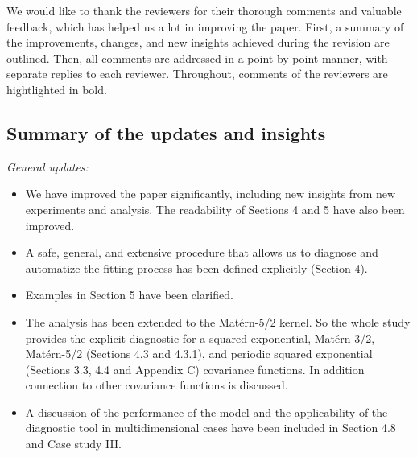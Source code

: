 \documentclass[11pt]{report}
\begin{document}
We would like to thank the reviewers for their thorough comments and valuable feedback, which has helped us a lot in improving the paper. First, a summary of the improvements, changes, and new insights achieved during the revision are outlined. Then, all comments are addressed in a point-by-point manner, with separate replies to each reviewer. 
Throughout, comments of the reviewers are hightlighted in bold.

\noindent \hdashrule{12.5cm}{0.2pt}{2mm 1pt}

\subsection*{Summary of the updates and insights}

\textit{General updates:}

\begin{itemize}

\item We have improved the paper significantly, including new insights from new experiments and analysis. The readability of Sections 4 and 5 have also been improved. 

\item A safe, general, and extensive procedure that allows us to diagnose and automatize the fitting process has been defined explicitly (Section 4). 

\item Examples in Section 5 have been clarified.

\item The analysis has been extended to the Mat\'ern-5/2 kernel. So the whole study provides the explicit diagnostic for a squared exponential, Mat\'ern-3/2, Mat\'ern-5/2 (Sections 4.3 and 4.3.1), and periodic squared exponential (Sections 3.3, 4.4 and Appendix C) covariance functions. In addition connection to other covariance functions is discussed.

\item A discussion of the performance of the model and the applicability of the diagnostic tool in multidimensional cases have been included in Section 4.8 and Case study III.


\end{itemize}
\end{document}
